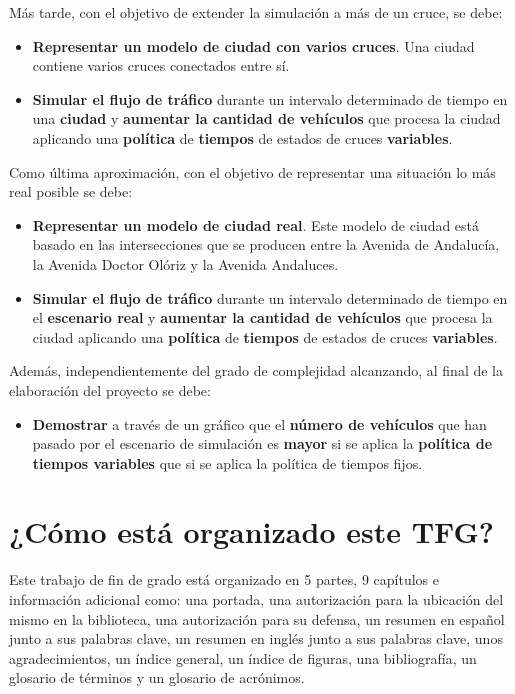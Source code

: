 Más tarde, con el objetivo de extender la simulación a más de un cruce, se debe:
\begin{itemize}
    \item \textbf{Representar un modelo de ciudad con varios cruces}. Una ciudad contiene varios cruces conectados entre sí.
    \item \textbf{Simular el flujo de tráfico} durante un intervalo determinado de tiempo en una \textbf{ciudad} y \textbf{aumentar la cantidad de vehículos} que procesa la ciudad aplicando una \textbf{política} de \textbf{tiempos} de estados de cruces \textbf{variables}.
\end{itemize}

Como última aproximación, con el objetivo de representar una situación lo más real posible se debe:
\begin{itemize}
    \item \textbf{Representar un modelo de ciudad real}. Este modelo de ciudad está basado en las intersecciones que se producen entre la Avenida de Andalucía, la Avenida Doctor Olóriz y la Avenida Andaluces.
    \item \textbf{Simular el flujo de tráfico} durante un intervalo determinado de tiempo en el \textbf{escenario real} y \textbf{aumentar la cantidad de vehículos} que procesa la ciudad aplicando una \textbf{política} de \textbf{tiempos} de estados de cruces \textbf{variables}.
\end{itemize}

Además, independientemente del grado de complejidad alcanzando, al final de la elaboración del proyecto se debe:
\begin{itemize}
    \item \textbf{Demostrar} a través de un gráfico que el \textbf{número de vehículos} que han pasado por el escenario de simulación es \textbf{mayor} si se aplica la \textbf{política de tiempos variables} que si se aplica la política de tiempos fijos.
\end{itemize}

\section{¿Cómo está organizado este TFG?}
Este trabajo de fin de grado está organizado en 5 partes, 9 capítulos e información adicional como: una portada, una autorización para la ubicación del mismo en la biblioteca, una autorización para su defensa, un resumen en español junto a sus palabras clave, un resumen en inglés junto a sus palabras clave, unos agradecimientos, un índice general, un índice de figuras, una bibliografía, un glosario de términos y un glosario de acrónimos.

